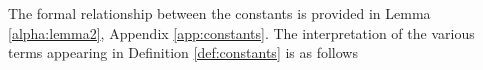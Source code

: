 \documentclass{article}
\def\rvw{{\mathbf{w}}}
\def\rvy{{\mathbf{y}}}
\newcommand{\w}{\mathbf{w}}
\begin{document}
%   
The  formal relationship between the constants is provided in 
Lemma \ref{alpha:lemma2}, Appendix \ref{app:constants}. %
The interpretation of the various terms appearing in  Definition \ref{def:constants} is as follows
\end{document}

